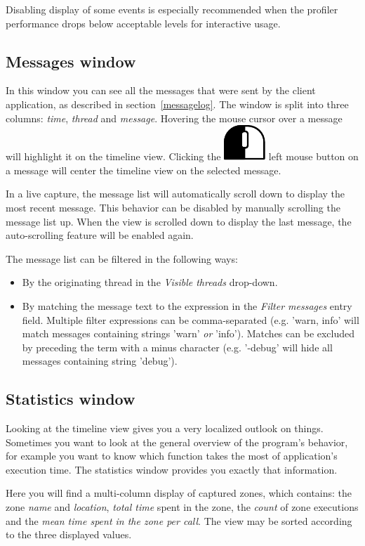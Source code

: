 \documentclass[hidelinks,titlepage,a4paper]{article}
\newcommand{\LMB}{\includegraphics[height=.8\baselineskip]{icons/lmb}}
\begin{document}
Disabling display of some events is especially recommended when the profiler performance drops below acceptable levels for interactive usage.

\subsection{Messages window}
\label{messages}

In this window you can see all the messages that were sent by the client application, as described in section~\ref{messagelog}. The window is split into three columns: \emph{time}, \emph{thread} and \emph{message}. Hovering the \faMousePointer{} mouse cursor over a message will highlight it on the timeline view. Clicking the \LMB{} left mouse button on a message will center the timeline view on the selected message.

In a live capture, the message list will automatically scroll down to display the most recent message. This behavior can be disabled by manually scrolling the message list up. When the view is scrolled down to display the last message, the auto-scrolling feature will be enabled again.

The message list can be filtered in the following ways:

\begin{itemize}
\item By the originating thread in the \emph{\faRandom{} Visible threads} drop-down.
\item By matching the message text to the expression in the \emph{Filter messages} entry field. Multiple filter expressions can be comma-separated (e.g. 'warn, info' will match messages containing strings 'warn' \emph{or} 'info'). Matches can be excluded by preceding the term with a minus character (e.g. '-debug' will hide all messages containing string 'debug').
\end{itemize}

\subsection{Statistics window}
\label{statistics}

Looking at the timeline view gives you a very localized outlook on things. Sometimes you want to look at the general overview of the program's behavior, for example you want to know which function takes the most of application's execution time. The statistics window provides you exactly that information.

Here you will find a multi-column display of captured zones, which contains: the zone \emph{name} and \emph{location}, \emph{total time} spent in the zone, the \emph{count} of zone executions and the \emph{mean time spent in the zone per call}. The view may be sorted according to the three displayed values.
\end{document}
